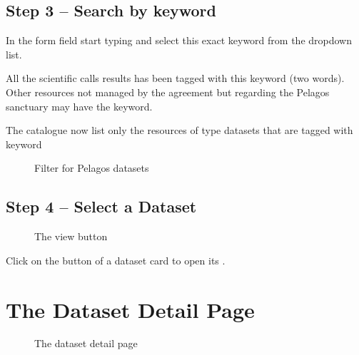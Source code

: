 \documentclass[letterpaper,10pt,english]{sphinxmanual}
\begin{document}
\subsection{Step 3 – Search by keyword}
\label{\detokenize{02_find_and_visualize:step-3-search-by-keyword}}
\sphinxAtStartPar
In the  form field start typing  and select this exact keyword from the dropdown list.

\sphinxAtStartPar
All the scientific calls results has been tagged with this keyword (two words).
Other resources not managed by the agreement but regarding the Pelagos sanctuary may have the  keyword.

\sphinxAtStartPar
The catalogue now list only the resources of type datasets that are tagged with keyword 

\begin{figure}[htbp]
\centering
\capstart

\noindent{}
\caption{Filter for Pelagos datasets}\label{\detokenize{02_find_and_visualize:id8}}\end{figure}


\subsection{Step 4 – Select a Dataset}
\label{\detokenize{02_find_and_visualize:step-4-select-a-dataset}}
\begin{figure}[htbp]
\centering
\capstart

\noindent{}
\caption{The view button}\label{\detokenize{02_find_and_visualize:id9}}\end{figure}

\sphinxAtStartPar
Click on the  button of a dataset card to open its .


\section{The Dataset Detail Page}
\label{\detokenize{02_find_and_visualize:the-dataset-detail-page}}
\begin{figure}[htbp]
\centering
\capstart

\noindent{}
\caption{The dataset detail page}\label{\detokenize{02_find_and_visualize:id10}}\end{figure}
\end{document}
